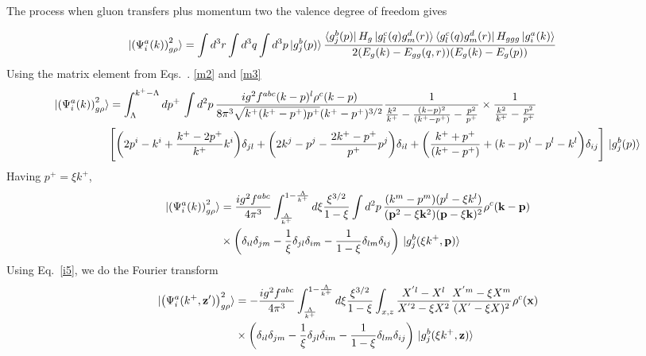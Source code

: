 \documentclass[aps,prd,amsmath,amssymb,nofootinbib]{revtex4-2}
\def\v#1{\mathbf{#1}}
\numberwithin{equation}{section}
\begin{document}
The process when gluon transfers plus momentum two the valence degree of freedom gives 
\begin{figure}[h]
\end{figure}
\begin{align}\label{onegrho2}
  \ket{ \left(\Psi^{a}_{i}(k) \right)^{2}_{g \rho} }%
   & =  \int d^{3}r \int d^{3}q \int d^{3}p
  \ket{g^{b}_{j}(p)}
  \frac{\bra{g^{b}_{j}(p)}H_{g}\ket{g^{c}_{l}(q)g^{d}_{m}(r)}\bra{g^{c}_{l}(q)g^{d}_{m}(r)}H_{ggg}\ket{g^{a}_{i}(k)}}{2(E_{g}(k)-E_{gg}(q,r))(E_{g }(k)-E_{g}(p))}
\end{align}
Using the matrix element from Eqs.~. \eqref{m2} and \eqref{m3}
\begin{align}\label{onegrho22}
\ket{ \left(\Psi^{a}_{i}(k) \right)^{2}_{g \rho} }   &= \int_{\Lambda}^{k^{+}-\Lambda}dp^{+}\,\int d^{2}p\,\frac{ig^{2}f^{abc}(k-p)^{l}\rho^{c}(k-p)}{8\pi^{3}\sqrt{k^{+}(k^{+}-p^{+})p^{+}}(k^{+}-p^{+})^{3/2}}\frac{1}{\frac{k^{2}}{k^{+}}-\frac{(k-p)^{2}}{(k^{+}-p^{+})}-\frac{p^{2}}{p^{+}}}\times \frac{1}{\frac{k^{2}}{k^{+}}-\frac{p^{2}}{p^{+}}}\notag \\ & \Bigg[\bigg(2p^{i}-k^{i}+\frac{k^{+}-2p^{+}}{k^{+}}k^{i}\bigg)\delta_{jl} +\bigg(2k^{j}-p^{j}-\frac{2k^{+}-p^{+}}{p^{+}}p^{j}\bigg)\delta_{il}+\bigg(\frac{k^{+}+p^{+}}{(k^{+}-p^{+})}+(k-p)^{l}-p^{l}-k^{l}\bigg)\delta_{ij}\Bigg]\,\ket{g^{b}_{j}(p)}
\end{align}
Having $p^{+} = \xi k^{+}$,
\begin{align}
\ket{ \left(\Psi^{a}_{i}(k) \right)^{2}_{g \rho} }   & = \frac{i g^2 f^{abc}} {4\pi^3} 
   \int_{\frac{\Lambda}{k^+}   }^{ 1- \frac{\Lambda }{k^+} } %
   d \xi 
  \frac{\xi^{3/2}}{1-\xi} 
   \int d^{2}p\,
  \frac{(k^m - p^m) (p^l - \xi k^l)} {(\v{p}^2-\xi \v{k}^2) (\v{p} - \xi \v{k})^2}
   \rho^c(\v{k}-\v{p})
  \notag \\ & \times 
  \left(\delta_{il} \delta_{jm} - \frac{1}{\xi} \delta_{jl} \delta_{im} - \frac{1}{1-\xi} \delta_{lm}\delta_{ij} \right)\,\ket{g^{b}_{j}(\xi k^+,\v{p})}
\end{align}
Using Eq.~\eqref{i5}, we do the Fourier transform
\begin{align}%
\label{Eq:onegrhoX2}
  \notag
  \ket{ \left(\Psi^{a}_{i}(k^+, \v{z}') \right)^{2}_{g \rho} }%
   &= - \frac{i g^2 f^{abc}} {4\pi^3} 
   \int_{\frac{\Lambda}{k^+}   }^{ 1- \frac{\Lambda }{k^+} } %
   d \xi 
  \frac{\xi^{3/2}}{1-\xi} 
   \int_{x,z}
   \frac{X^{'l} - X^l} {X^{'2} - \xi X^2}
   \frac{X^{'m} -  \xi X^m} {(X^{'} -  \xi X)^2}
   \rho^c(\v{x})
  \notag \\ & \times 
  \left(\delta_{il} \delta_{jm} - \frac{1}{\xi} \delta_{jl} \delta_{im} - \frac{1}{1-\xi} \delta_{lm}\delta_{ij} \right)\,\ket{g^{b}_{j}(\xi k^+,\v{z})}
\end{align}
\end{document}
